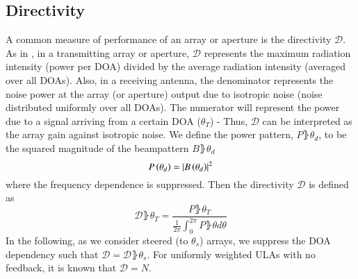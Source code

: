 \subsection{Directivity}
A common measure of performance of an array or aperture is the directivity $\mathcal{D}$.
As in \cite{van2004optimum}, in a transmitting array or aperture, $\mathcal{D}$ represents the maximum radiation intensity (power per DOA) divided by the average radiation intensity (averaged over all DOAs).
Also, in a receiving antenna, the denominator represents the noise power at the array (or aperture) output due to isotropic noise (noise distributed uniformly over all DOAs). 
The numerator will represent the power due to a signal arriving from a certain DOA ($\theta_{T}$) - Thus, $\mathcal{D}$ can be interpreted as the array gain against isotropic noise.
We define the power pattern, $P\rBrace{\theta_{d}}$, to be the squared magnitude of the beampattern $B\rBrace{\theta_{d}}$
\begin{equation}
    P\left({\theta_{d}}\right) = \left\vert B\left({\theta_{d}}\right)\right\vert^{2}
\end{equation}
where the frequency dependence is suppressed.
Then the directivity $\mathcal{D}$ is defined as
\begin{equation}\label{eq_D}
    \mathcal{D}\rBrace{\theta_{T}} = \frac{
    P\rBrace{\theta_{T}}
    }{
    \frac{1}{2\pi}\int_{0}^{2\pi}P\rBrace{\theta}d\theta
    }
\end{equation}
In the following, as we consider steered (to $\theta_{s}$) arrays, we suppress the DOA dependency such that $\mathcal{D} = \mathcal{D}\rBrace{{\theta_{s}}}$. 
For uniformly weighted ULAs with no feedback, it is known \cite{van2004optimum} that $\mathcal{D} = N$.
